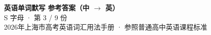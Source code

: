 \documentclass[10pt,a4paper]{article}
\begin{document}
\pagestyle{plain}

\begin{center}
{\LARGE\bfseries 英语单词默写 \quad 参考答案（中 $\to$ 英）}\\[0.22em]
{\large S 字母 · 第 3 / 9 份}\\[0.18em]
{\small 2026年上海市高考英语词汇用法手册 · 参照普通高中英语课程标准}
\end{center}

\vspace{0.2em}
\noindent{\color{rulegray}\rule{\textwidth}{0.8pt}}

\vspace{0.35em}

\vspace{0.25em}
\renewcommand{\arraystretch}{1.32}
\end{document}
